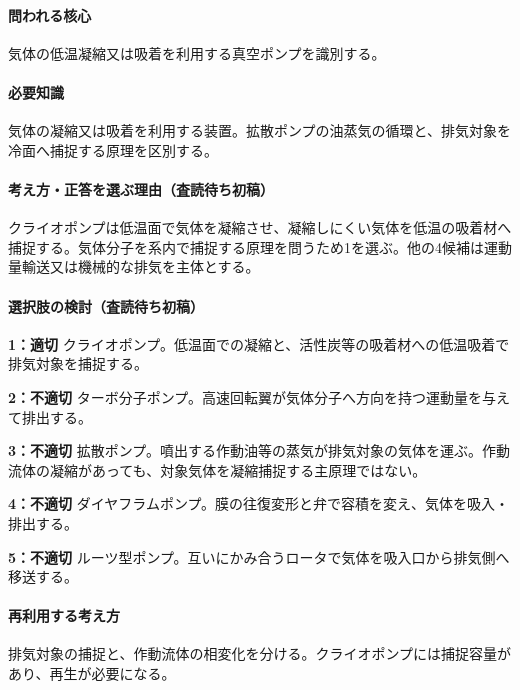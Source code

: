 \paragraph{問われる核心} 気体の低温凝縮又は吸着を利用する真空ポンプを識別する。

\paragraph{必要知識} 気体の凝縮又は吸着を利用する装置。拡散ポンプの油蒸気の循環と、排気対象を冷面へ捕捉する原理を区別する。

\paragraph{考え方・正答を選ぶ理由（査読待ち初稿）} クライオポンプは低温面で気体を凝縮させ、凝縮しにくい気体を低温の吸着材へ捕捉する。気体分子を系内で捕捉する原理を問うため1を選ぶ。他の4候補は運動量輸送又は機械的な排気を主体とする。

\paragraph{選択肢の検討（査読待ち初稿）}\mbox{}\par

\noindent\textbf{1：適切} クライオポンプ。低温面での凝縮と、活性炭等の吸着材への低温吸着で排気対象を捕捉する。\par

\noindent\textbf{2：不適切} ターボ分子ポンプ。高速回転翼が気体分子へ方向を持つ運動量を与えて排出する。\par

\noindent\textbf{3：不適切} 拡散ポンプ。噴出する作動油等の蒸気が排気対象の気体を運ぶ。作動流体の凝縮があっても、対象気体を凝縮捕捉する主原理ではない。\par

\noindent\textbf{4：不適切} ダイヤフラムポンプ。膜の往復変形と弁で容積を変え、気体を吸入・排出する。\par

\noindent\textbf{5：不適切} ルーツ型ポンプ。互いにかみ合うロータで気体を吸入口から排気側へ移送する。\par

\paragraph{再利用する考え方} 排気対象の捕捉と、作動流体の相変化を分ける。クライオポンプには捕捉容量があり、再生が必要になる。

